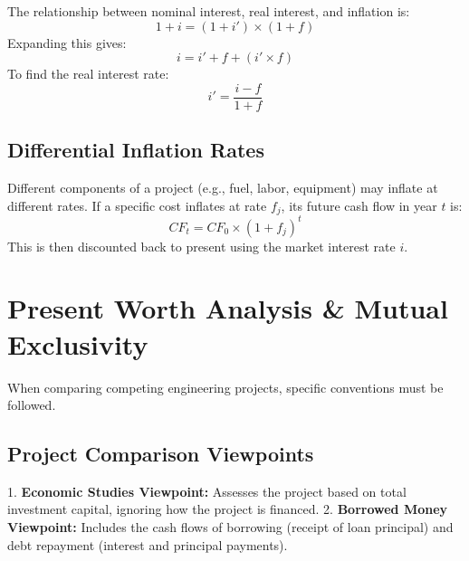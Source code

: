 \documentclass[12pt,a4paper]{article}
\begin{document}
\begin{tcolorbox}[formulabox, title={\textbf{Fisher's Equation}}]
The relationship between nominal interest, real interest, and inflation is:
\begin{equation}
  1 + i = (1 + i') \times (1 + f)
\end{equation}
Expanding this gives:
\begin{equation}
  i = i' + f + (i' \times f)
\end{equation}
To find the real interest rate:
\begin{equation}
  i' = \frac{i - f}{1 + f}
\end{equation}
\end{tcolorbox}

\subsection{Differential Inflation Rates}
Different components of a project (e.g., fuel, labor, equipment) may inflate at different rates. If a specific cost inflates at rate $f_j$, its future cash flow in year $t$ is:
\begin{equation}
  CF_t = CF_0 \times (1 + f_j)^t
\end{equation}
This is then discounted back to present using the market interest rate $i$.

\section{Present Worth Analysis \& Mutual Exclusivity}

When comparing competing engineering projects, specific conventions must be followed.

\subsection{Project Comparison Viewpoints}
1.  \textbf{Economic Studies Viewpoint:} Assesses the project based on total investment capital, ignoring how the project is financed.
2.  \textbf{Borrowed Money Viewpoint:} Includes the cash flows of borrowing (receipt of loan principal) and debt repayment (interest and principal payments).
\end{document}
